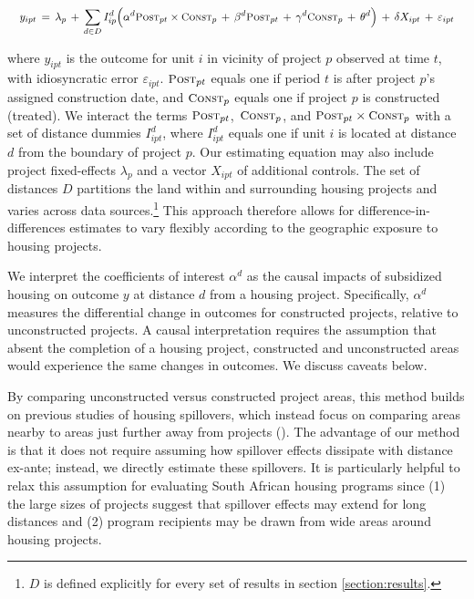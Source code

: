\documentclass[12pt]{article}
\begin{document}
\begin{equation}\label{eq:main}
\quad y_{ipt} \, = \, \lambda_{p} \,+\, \sum\limits_{d\in D} I^d_{ip}\Big( \alpha^d \textsc{\small Post}_{pt}\times\textsc{\small Const}_{p} \, + \, \beta^d\textsc{\small Post}_{pt} \, + \, \gamma^d\textsc{\small Const}_{p} \, + \, \theta^{d} \Big) \, + \, \delta X_{ipt} \, + \, \varepsilon_{ipt} \quad 
\end{equation}

\noindent where $y_{ipt}$ is the outcome for unit $i$ in vicinity of project $p$ observed at time $t$, with idiosyncratic error $\varepsilon_{ipt}$. $\textsc{\small Post}_{pt}$ equals one if period $t$ is after project $p$'s assigned construction date, and $\textsc{\small Const}_{p}$ equals one if project $p$ is constructed (treated). We interact the terms $\textsc{\small Post}_{pt}$, $\,\textsc{\small Const}_{p}$, and $\textsc{\small Post}_{pt}\times\textsc{\small Const}_{p}$ with a set of distance dummies $I^d_{ipt}$, where $I^d_{ipt}$ equals one if unit $i$ is located at distance $d$ from the boundary of project $p$. Our estimating equation may also include project fixed-effects $\lambda_{p}$ and a vector $X_{ipt}$ of additional controls. The set of distances $D$ partitions the land within and surrounding housing projects and varies across data sources.\footnote{$D$ is defined explicitly for every set of results in section \ref{section:results}.} This approach therefore allows for difference-in-differences estimates to vary flexibly according to the geographic exposure to housing projects.

We interpret the coefficients of interest $\alpha^d$ as the causal impacts of subsidized housing on outcome $y$ at distance $d$ from a housing project. Specifically, $\alpha^d$ measures the differential change in outcomes for constructed projects, relative to unconstructed projects.  A causal interpretation requires the assumption that absent the completion of a housing project, constructed and unconstructed areas would experience the same changes in outcomes. We discuss caveats below.

By comparing unconstructed versus constructed project areas, this method builds on previous studies of housing spillovers, which instead focus on comparing areas nearby to areas just further away from projects (\cite{diamond2016wants}).  The advantage of our method is that it does not require assuming how spillover effects dissipate with distance ex-ante; instead, we directly estimate these spillovers.  It is particularly helpful to relax this assumption for evaluating South African housing programs since (1) the large sizes of projects suggest that spillover effects may extend for long distances and (2) program recipients may be drawn from wide areas around housing projects.  
\end{document}
